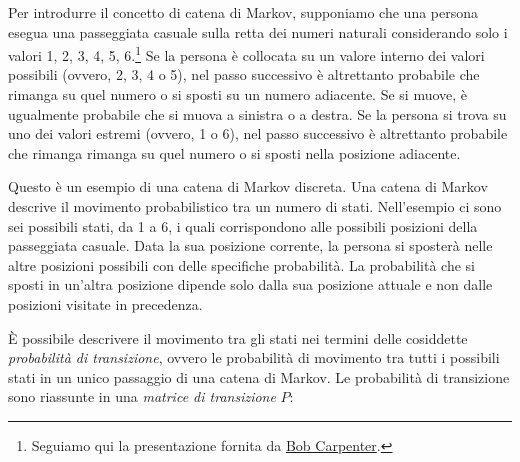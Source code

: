 \documentclass[
  10pt,
  italian,
  a4paper,
  extrafontsizes,onecolumn,openright
  ]{memoir}
\begin{document}
Per introdurre il concetto di catena di Markov, supponiamo che una persona esegua una passeggiata casuale sulla retta dei numeri naturali considerando solo i valori 1, 2, 3, 4, 5, 6.\footnote{Seguiamo qui la presentazione fornita da \href{https://github.com/bob-carpenter/prob-stats}{Bob Carpenter}.} Se la persona è collocata su un valore interno dei valori possibili (ovvero, 2, 3, 4 o 5), nel passo successivo è altrettanto probabile che rimanga su quel numero o si sposti su un numero adiacente. Se si muove, è ugualmente probabile che si muova a sinistra o a destra. Se la persona si trova su uno dei valori estremi (ovvero, 1 o 6), nel passo successivo è altrettanto probabile che rimanga rimanga su quel numero o si sposti nella posizione adiacente.

Questo è un esempio di una catena di Markov discreta. Una catena di Markov descrive il movimento probabilistico tra un numero di stati. Nell'esempio ci sono sei possibili stati, da 1 a 6, i quali corrispondono alle possibili posizioni della passeggiata casuale. Data la sua posizione corrente, la persona si sposterà nelle altre posizioni possibili con delle specifiche probabilità. La probabilità che si sposti in un'altra posizione dipende solo dalla sua posizione attuale e non dalle posizioni visitate in precedenza.

È possibile descrivere il movimento tra gli stati nei termini delle cosiddette \emph{probabilità di transizione}, ovvero le probabilità di movimento tra tutti i possibili stati in un unico passaggio di una catena di Markov. Le probabilità di transizione sono riassunte in una \emph{matrice di transizione} \(P\):
\end{document}

